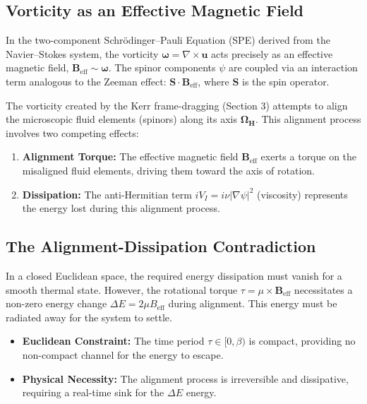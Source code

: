 \documentclass[11pt]{article}
\begin{document}
\subsection{Vorticity as an Effective Magnetic Field}

In the two-component Schrödinger--Pauli Equation (SPE) derived from the Navier--Stokes system, the vorticity $\mathbf{\omega} = \nabla \times \mathbf{u}$ acts precisely as an effective magnetic field, $\mathbf{B}_{\text{eff}} \sim \mathbf{\omega}$. The spinor components $\psi$ are coupled via an interaction term analogous to the Zeeman effect: $\mathbf{S} \cdot \mathbf{B}_{\text{eff}}$, where $\mathbf{S}$ is the spin operator.

The vorticity created by the Kerr frame-dragging (Section 3) attempts to align the microscopic fluid elements (spinors) along its axis $\mathbf{\Omega_H}$. This alignment process involves two competing effects:

\begin{enumerate}
    \item \textbf{Alignment Torque:} The effective magnetic field $\mathbf{B}_{\text{eff}}$ exerts a torque on the misaligned fluid elements, driving them toward the axis of rotation.
    \item \textbf{Dissipation:} The anti-Hermitian term $iV_I = i\nu|\nabla\psi|^2$ (viscosity) represents the energy lost during this alignment process.
\end{enumerate}

\subsection{The Alignment-Dissipation Contradiction}

In a closed Euclidean space, the required energy dissipation must vanish for a smooth thermal state. However, the rotational torque $\tau = \mu \times \mathbf{B}_{\text{eff}}$ necessitates a non-zero energy change $\Delta E = 2\mu B_{\text{eff}}$ during alignment. This energy must be radiated away for the system to settle.

\begin{itemize}
    \item \textbf{Euclidean Constraint:} The time period $\tau \in [0,\beta)$ is compact, providing no non-compact channel for the energy to escape.
    \item \textbf{Physical Necessity:} The alignment process is irreversible and dissipative, requiring a real-time sink for the $\Delta E$ energy.
\end{itemize}
\end{document}
